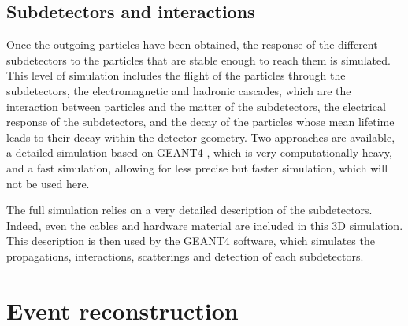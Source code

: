 \subsection{Subdetectors and interactions}

Once the outgoing particles have been obtained, the response of the different subdetectors to the particles that are stable enough to reach them is simulated. This level of simulation includes the flight of the particles through the subdetectors, the electromagnetic and hadronic cascades, which are the interaction between particles and the matter of the subdetectors, the electrical response of the subdetectors, and the decay of the particles whose mean lifetime leads to their decay within the detector geometry. Two approaches are available, a detailed simulation based on GEANT4 \cite{AGOSTINELLI2003250}, which is very computationally heavy, and a fast simulation, allowing for less precise but faster simulation, which will not be used here.

The full simulation relies on a very detailed description of the subdetectors. Indeed, even the cables and hardware material are included in this 3D simulation. This description is then used by the GEANT4 software, which simulates the propagations, interactions, scatterings and detection of each subdetectors.


\section{Event reconstruction}
\label{sec:cms_physics_event_reconstruction}

